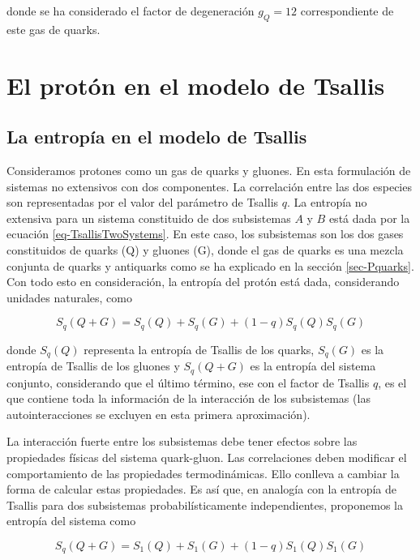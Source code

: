 donde se ha considerado el factor de degeneración ${g}_{Q} = 12$ correspondiente de este gas de quarks.

\section{El protón en el modelo de Tsallis}

\subsection{La entropía en el modelo de Tsallis}

Consideramos protones como un gas de quarks y gluones. En esta formulación de sistemas no extensivos con dos componentes. La correlación entre las dos especies son representadas por el valor del parámetro de Tsallis $q$. La entropía no extensiva para un sistema constituido de dos subsistemas $A$ y $B$ está dada por la ecuación \eqref{eq-TsallisTwoSystems}. En este caso, los subsistemas son los dos gases constituidos de quarks (Q) y gluones (G), donde el gas de quarks es una mezcla conjunta de quarks y antiquarks como se ha explicado en la sección \ref{sec-Pquarks}. Con todo esto en consideración, la entropía del protón está dada, considerando unidades naturales, como

\begin{equation}
{S}_{q}(Q+G) = {S}_{q}(Q) + {S}_{q}(G) + (1-q){S}_{q}(Q){S}_{q}(G)
\end{equation}

donde ${S}_{q}(Q)$ representa la entropía de Tsallis de los quarks, ${S}_{q}(G)$ es la entropía de Tsallis de los gluones y ${S}_{q}(Q+G)$ es la entropía del sistema conjunto, considerando que el último término, ese con el factor de Tsallis $q$, es el que contiene toda la información de la interacción de los subsistemas (las autointeracciones se excluyen en esta primera aproximación).

La interacción fuerte entre los subsistemas debe tener efectos sobre las propiedades físicas del sistema quark-gluon. Las correlaciones deben modificar el comportamiento de las propiedades termodinámicas. Ello conlleva a cambiar la forma de calcular estas propiedades. Es así  que, en analogía con la entropía de Tsallis para dos subsistemas probabilísticamente independientes, proponemos la entropía del sistema como

\begin{equation}\label{eq-Entropy-Quark-Gluon}
{S}_{q}(Q + G) = {S}_{1}(Q) + {S}_{1}(G) + (1-q){S}_{1}(Q){S}_{1}(G)
\end{equation}

